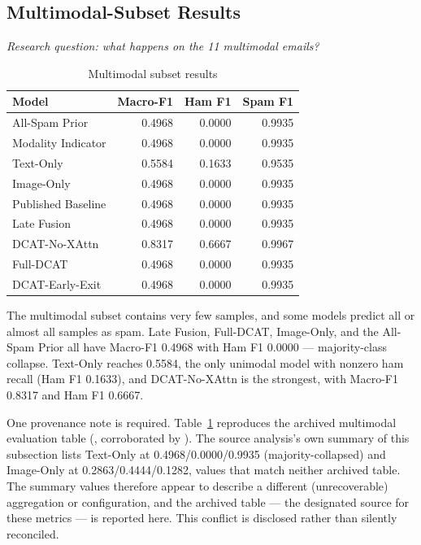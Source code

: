 \documentclass[10pt,twoside]{article}
\begin{document}
\subsection{Multimodal-Subset Results}\label{sec:mm-results}

\emph{Research question: what happens on the 11 multimodal emails?}

\begin{table}[t]
\centering
\caption{Multimodal subset results}
\label{tab:mm}
\small
\begin{tabular}{lrrr}
\toprule
Model & Macro-F1 & Ham F1 & Spam F1 \\
\midrule
All-Spam Prior & 0.4968 & 0.0000 & 0.9935 \\
Modality Indicator & 0.4968 & 0.0000 & 0.9935 \\
Text-Only & 0.5584 & 0.1633 & 0.9535 \\
Image-Only & 0.4968 & 0.0000 & 0.9935 \\
Published Baseline & 0.4968 & 0.0000 & 0.9935 \\
Late Fusion & 0.4968 & 0.0000 & 0.9935 \\
DCAT-No-XAttn & 0.8317 & 0.6667 & 0.9967 \\
Full-DCAT & 0.4968 & 0.0000 & 0.9935 \\
DCAT-Early-Exit & 0.4968 & 0.0000 & 0.9935 \\
\bottomrule
\end{tabular}
\end{table}

The multimodal subset contains very few samples, and some models predict all or almost all samples as spam. Late Fusion, Full-DCAT, Image-Only, and the All-Spam Prior all have Macro-F1 0.4968 with Ham F1 0.0000 --- majority-class collapse. Text-Only reaches 0.5584, the only unimodal model with nonzero ham recall (Ham F1 0.1633), and DCAT-No-XAttn is the strongest, with Macro-F1 0.8317 and Ham F1 0.6667.

One provenance note is required. Table~\ref{tab:mm} reproduces the archived multimodal evaluation table (, corroborated by ). The source analysis's own summary of this subsection lists Text-Only at 0.4968/0.0000/0.9935 (majority-collapsed) and Image-Only at 0.2863/0.4444/0.1282, values that match neither archived table. The summary values therefore appear to describe a different (unrecoverable) aggregation or configuration, and the archived table --- the designated source for these metrics --- is reported here. This conflict is disclosed rather than silently reconciled.
\end{document}
